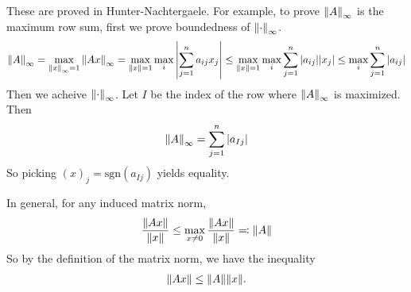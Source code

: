 \documentclass{article}
\newcommand{\sgn}{\text{sgn}}
\begin{document}
                These are proved in Hunter-Nachtergaele.  For example, to prove $\norm{A}_\infty$ is the maximum row sum, first we prove boundedness of $\norm{\cdot}_\infty$.
                \begin{align*}
                    \norm{A}_\infty = \max_{\norm{x}_\infty = 1} \norm{Ax}_\infty = \max_{\norm{x} = 1}\max_i\abs{\sum_{j=1}^n a_{ij}x_j} \leq \max_{\norm{x}=1}\max_i\sum_{j=1}^n\abs{a_{ij}}\abs{x_j} \leq \max_i\sum_{j=1}^n\abs{a_{ij}}
                \end{align*}
                Then we acheive $\norm{\cdot}_\infty$. Let $I$ be the index of the row where $\norm{A}_\infty$ is maximized.  Then
                \begin{align*}
                    \norm{A}_\infty = \sum_{j=1}^n\abs{a_{Ij}}
                \end{align*}
                So picking $(x)_j = \sgn(a_{Ij})$ yields equality.

                In general, for any induced matrix norm,
                \begin{align*}
                    \frac{\norm{Ax}}{\norm{x}} \leq \max_{x \neq 0}\frac{\norm{Ax}}{\norm{x}} \eqqcolon \norm{A}
                \end{align*}
                So by the definition of the matrix norm, we have the inequality
                \begin{align*}
                    \norm{Ax} \leq \norm{A}\norm{x}.
                \end{align*}
\end{document}

